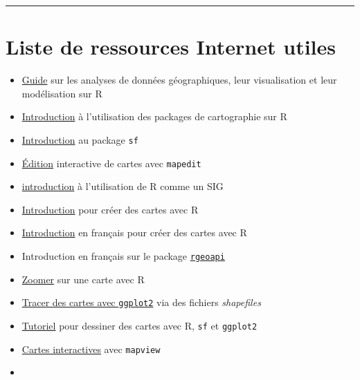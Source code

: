 \documentclass[
  french,
]{book}
\providecommand{\tightlist}{%
  \setlength{\itemsep}{0pt}\setlength{\parskip}{0pt}}
\begin{document}
\begin{center}\rule{0.5\linewidth}{0.5pt}\end{center}

\hypertarget{ref-sig}{%
\section*{Liste de ressources Internet utiles}\label{ref-sig}}

\begin{itemize}
\tightlist
\item
  \href{https://geocompr.robinlovelace.net/}{Guide} sur les analyses de données
  géographiques, leur visualisation et leur modélisation sur R
\item
  \href{https://statnmap.com/2018-07-14-introduction-to-mapping-with-sf-and-co/}{Introduction}
  à l'utilisation des packages de cartographie sur R
\item
  \href{https://www.infoworld.com/article/3505897/how-to-do-spatial-analysis-in-r-with-sf.amp.html}{Introduction}
  au package \texttt{sf}
\item
  \href{https://github.com/r-spatial/mapedit}{Édition} interactive de cartes avec
  \texttt{mapedit}
\item
  \href{https://mhallwor.github.io/_pages/welcome}{introduction} à l'utilisation de R
  comme un SIG
\item
  \href{http://eriqande.github.io/rep-res-web/lectures/making-maps-with-R.html}{Introduction}
  pour créer des cartes avec R
\item
  \href{https://thinkr.fr/sil-te-plait-dessine-moi-carte-r/}{Introduction}
  en français pour créer des cartes avec R
\item
  Introduction en français sur le package
  \href{https://colinfay.me/carte-r-rgeoapi-ggplot2/}{\texttt{rgeoapi}}
\item
  \href{https://rgeomatic.hypotheses.org/tag/sf}{Zoomer} sur une carte avec R
\item
  \href{https://rpubs.com/huanfaChen/ggplotShapefile}{Tracer des cartes avec \texttt{ggplot2}}
  via des fichiers \emph{shapefiles}
\item
  \href{https://www.r-spatial.org/r/2018/10/25/ggplot2-sf.html}{Tutoriel}
  pour dessiner des cartes avec R, \texttt{sf} et \texttt{ggplot2}
\item
  \href{https://r-spatial.github.io/mapview/}{Cartes interactives} avec \texttt{mapview}
\item

\end{itemize}
\end{document}

